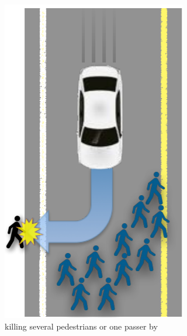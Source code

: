\begin{figure}[!ht]
    \centering
    \begin{subfigure}{0.3\textwidth}
      \centering
  \includegraphics[scale=0.75, width=\textwidth]{images/chapter10/dilemmaA.png}
      \caption{killing several pedestrians or one passer by}
      \label{fig:a}
    \end{subfigure}
    \hspace{\fill}
    \begin{subfigure}{0.3\textwidth}

\end{subfigure}
\end{figure}
